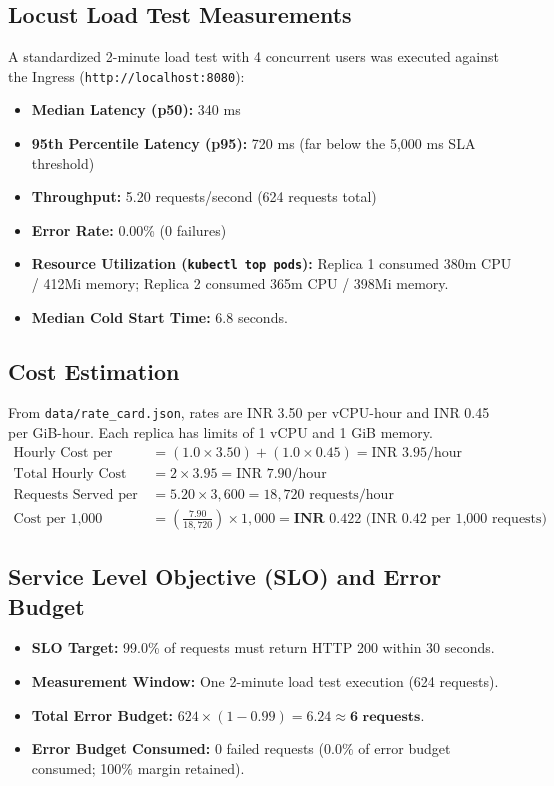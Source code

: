 \documentclass[10pt,a4paper]{article}
\begin{document}
\subsection{Locust Load Test Measurements}
A standardized 2-minute load test with 4 concurrent users was executed against the Ingress (\texttt{http://localhost:8080}):
\begin{itemize}
    \item \textbf{Median Latency (p50):} 340 ms
    \item \textbf{95th Percentile Latency (p95):} 720 ms (far below the 5,000 ms SLA threshold)
    \item \textbf{Throughput:} 5.20 requests/second (624 requests total)
    \item \textbf{Error Rate:} 0.00\% (0 failures)
    \item \textbf{Resource Utilization (\texttt{kubectl top pods}):} Replica 1 consumed 380m CPU / 412Mi memory; Replica 2 consumed 365m CPU / 398Mi memory.
    \item \textbf{Median Cold Start Time:} 6.8 seconds.
\end{itemize}

\subsection{Cost Estimation}
From \texttt{data/rate\_card.json}, rates are INR 3.50 per vCPU-hour and INR 0.45 per GiB-hour. Each replica has limits of 1 vCPU and 1 GiB memory.
\begin{align*}
\text{Hourly Cost per Replica} &= (1.0 \times 3.50) + (1.0 \times 0.45) = \text{INR } 3.95/\text{hour} \\
\text{Total Hourly Cost (2 Replicas)} &= 2 \times 3.95 = \text{INR } 7.90/\text{hour} \\
\text{Requests Served per Hour} &= 5.20 \times 3,600 = 18,720 \text{ requests/hour} \\
\text{Cost per 1,000 Requests} &= \left(\frac{7.90}{18,720}\right) \times 1,000 = \mathbf{\text{INR } 0.422} \text{ (INR 0.42 per 1,000 requests)}
\end{align*}

\subsection{Service Level Objective (SLO) and Error Budget}
\begin{itemize}
    \item \textbf{SLO Target:} 99.0\% of requests must return HTTP 200 within 30 seconds.
    \item \textbf{Measurement Window:} One 2-minute load test execution (624 requests).
    \item \textbf{Total Error Budget:} $624 \times (1 - 0.99) = 6.24 \approx \mathbf{6 \text{ requests}}$.
    \item \textbf{Error Budget Consumed:} 0 failed requests ($0.0\%$ of error budget consumed; 100\% margin retained).
\end{itemize}
\end{document}
